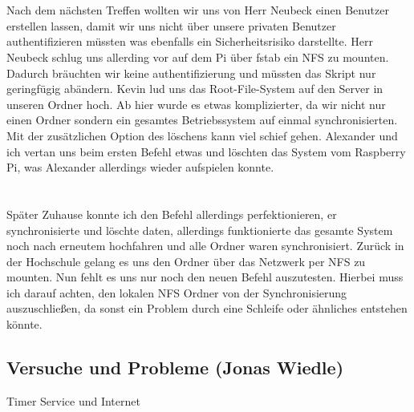 \documentclass{article}
\begin{document}
\\\\
Nach dem nächsten Treffen wollten wir uns von Herr Neubeck einen Benutzer erstellen lassen, damit wir uns nicht über unsere privaten Benutzer authentifizieren müssten was ebenfalls ein Sicherheitsrisiko darstellte.
Herr Neubeck schlug uns allerding vor auf dem Pi über fstab ein NFS zu mounten. Dadurch bräuchten wir keine authentifizierung und müssten das Skript nur geringfügig abändern. Kevin lud uns das Root-File-System auf den Server in unseren Ordner hoch.
Ab hier wurde es etwas komplizierter, da wir nicht nur einen Ordner sondern ein gesamtes Betriebssystem auf einmal synchronisierten. Mit der zusätzlichen Option des löschens kann viel schief gehen. Alexander und ich vertan uns beim ersten Befehl etwas und löschten das System vom Raspberry Pi, was Alexander allerdings wieder aufspielen konnte.
\\\\\\
Später Zuhause konnte ich den Befehl allerdings perfektionieren, er synchronisierte und löschte daten, allerdings funktionierte das gesamte System noch nach erneutem hochfahren und alle Ordner waren synchronisiert.
Zurück in der Hochschule gelang es uns den Ordner über das Netzwerk per NFS zu mounten. Nun fehlt es uns nur noch den neuen Befehl auszutesten. Hierbei muss ich darauf achten, den lokalen NFS Ordner von der Synchronisierung auszuschließen, da sonst ein Problem durch eine Schleife oder ähnliches entstehen könnte.
\subsection{Versuche und Probleme (Jonas Wiedle)}

Timer Service und Internet
\end{document}
